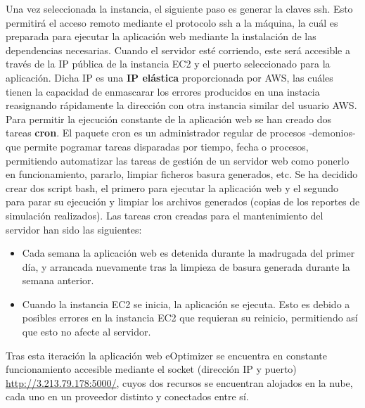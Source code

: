 Una vez seleccionada la instancia, el siguiente paso es generar la claves ssh. Esto permitirá el acceso remoto mediante el protocolo ssh a la máquina, la cuál es preparada para ejecutar la aplicación web mediante la instalación de las dependencias necesarias. Cuando el servidor esté corriendo, este será accesible a través de la IP pública de la instancia \gls{EC2} y el puerto seleccionado para la aplicación. Dicha IP es una \textbf{IP elástica} proporcionada por \gls{AWS}, las cuáles tienen la capacidad de enmascarar los errores producidos en una instacia reasignando rápidamente la dirección con otra instancia similar del usuario \gls{AWS}. Para permitir la ejecución constante de la aplicación web se han creado dos tareas \textbf{cron}. El paquete cron es un administrador regular de procesos -demonios- que permite pogramar tareas disparadas por tiempo, fecha o procesos, permitiendo automatizar las tareas de gestión de un servidor web como ponerlo en funcionamiento, pararlo, limpiar ficheros basura generados, etc. Se ha decidido crear dos script bash, el primero para ejecutar la aplicación web y el segundo para parar su ejecución y limpiar los archivos generados (copias de los reportes de simulación realizados). Las tareas cron creadas para el mantenimiento del servidor han sido las siguientes:
\begin{itemize}
\item Cada semana la aplicación web es detenida durante la madrugada del primer día, y arrancada nuevamente tras la limpieza de basura generada durante la semana anterior.
\item Cuando la instancia \gls{EC2} se inicia, la aplicación se ejecuta. Esto es debido a posibles errores en la instancia \gls{EC2} que requieran su reinicio, permitiendo así que esto no afecte al servidor.
\end{itemize}

Tras esta iteración la aplicación web eOptimizer se encuentra en constante funcionamiento accesible mediante el socket (dirección IP y puerto) \url{http://3.213.79.178:5000/}, cuyos dos recursos se encuentran alojados en la nube, cada uno en un proveedor distinto y conectados entre sí.\\

\centerline{}

